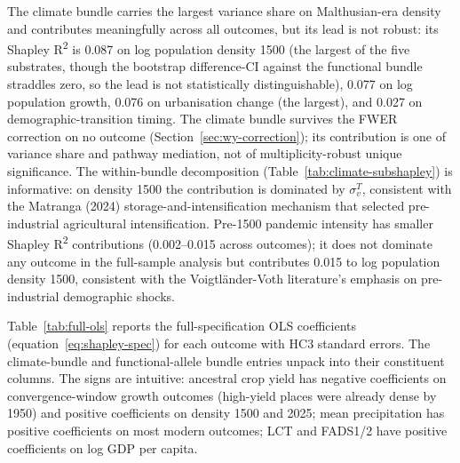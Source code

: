 \documentclass[11pt,letterpaper]{article}
\begin{document}
The climate bundle carries the largest variance share on Malthusian-era density and contributes meaningfully across all outcomes, but its lead is not robust: its Shapley R\textsuperscript{2} is 0.087 on log population density 1500 (the largest of the five substrates, though the bootstrap difference-CI against the functional bundle straddles zero, so the lead is not statistically distinguishable), 0.077 on log population growth, 0.076 on urbanisation change (the largest), and 0.027 on demographic-transition timing. The climate bundle survives the FWER correction on no outcome (Section~\ref{sec:wy-correction}); its contribution is one of variance share and pathway mediation, not of multiplicity-robust unique significance. The within-bundle decomposition (Table~\ref{tab:climate-subshapley}) is informative: on density 1500 the contribution is dominated by $\sigma_v^T$, consistent with the Matranga (2024) storage-and-intensification mechanism that selected pre-industrial agricultural intensification. Pre-1500 pandemic intensity has smaller Shapley R\textsuperscript{2} contributions (0.002--0.015 across outcomes); it does not dominate any outcome in the full-sample analysis but contributes 0.015 to log population density 1500, consistent with the Voigtl\"ander-Voth literature's emphasis on pre-industrial demographic shocks.

\begin{table}[H]
  \centering
  \caption{Within-bundle Shapley R\textsuperscript{2} decomposition for the four climate primitives, conditional on the three non-climate scalar substrates (predicted heterozygosity, ancestral crop yield, pandemic intensity) plus geography controls. The column sum is the marginal R\textsuperscript{2} of the climate bundle conditional on everything else and is therefore smaller than the climate bundle's grouped Shapley value in Table~\ref{tab:shapley}.}
  \label{tab:climate-subshapley}
  \small
  
\end{table}

Table~\ref{tab:full-ols} reports the full-specification OLS coefficients (equation~\ref{eq:shapley-spec}) for each outcome with HC3 standard errors. The climate-bundle and functional-allele bundle entries unpack into their constituent columns. The signs are intuitive: ancestral crop yield has negative coefficients on convergence-window growth outcomes (high-yield places were already dense by 1950) and positive coefficients on density 1500 and 2025; mean precipitation has positive coefficients on most modern outcomes; LCT and FADS1/2 have positive coefficients on log GDP per capita.
\end{document}
